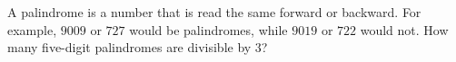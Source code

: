 A palindrome is a number that is read the same forward or backward. For example, $9009$ or $727$ would be palindromes, while $9019$ or $722$ would not. How many five-digit palindromes are divisible by $3$?
